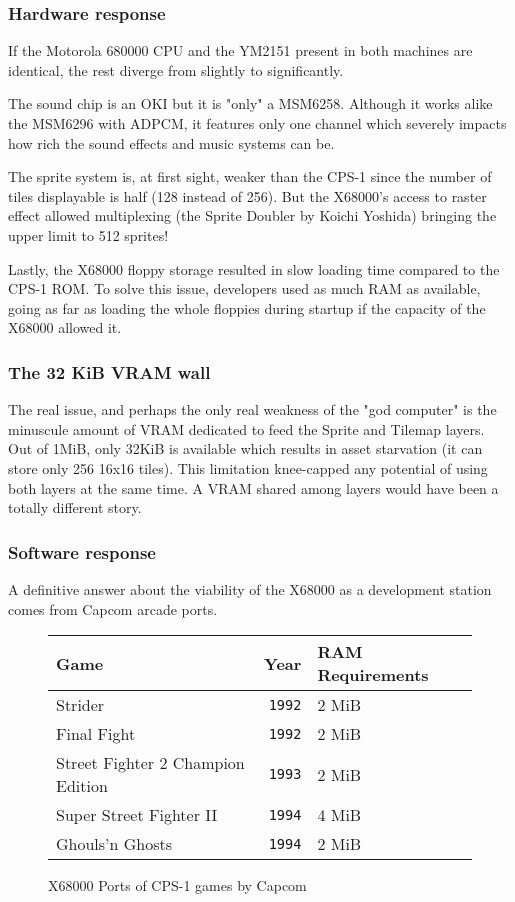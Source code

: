 \subsubsection{Hardware response}
If the Motorola 680000 CPU and the YM2151 present in both machines are identical, the rest diverge from slightly to significantly.

The sound chip is an OKI but it is "only" a MSM6258. Although it works alike the MSM6296 with ADPCM, it features only one channel which severely impacts how rich the sound effects and music systems can be.

The sprite system is, at first sight, weaker than the CPS-1 since the number of tiles displayable is half (128 instead of 256). But the X68000's  access to raster effect allowed multiplexing (the Sprite Doubler by Koichi Yoshida\cite{x68000spritedoubler}) bringing the upper limit to 512 sprites!

Lastly, the X68000 floppy storage resulted in slow loading time compared to the CPS-1 ROM. To solve this issue, developers used as much RAM as available, going as far as loading the whole floppies during startup if the capacity of the X68000 allowed it.



\subsubsection{The 32 KiB VRAM wall}

The real issue, and perhaps the only real weakness of the "god computer" is the minuscule amount of VRAM dedicated to feed the Sprite and Tilemap layers. Out of 1MiB, only 32KiB is available which results in asset starvation (it can store only  256 16x16 tiles). This limitation knee-capped any potential of using both layers at the same time. A VRAM shared among layers would have been a totally different story.

\subsubsection{Software response}

A definitive answer about the viability of the X68000 as a development station comes from Capcom arcade ports.
\begin{figure}[H]
\label{x68000-specs}
\begin{tabularx}{\textwidth}{lrY}
  \toprule    
  \textbf{Game } & \textbf{Year}  & \textbf{RAM Requirements } \\               
  \toprule   
  Strider & \texttt{1992} &  2 MiB \\
  Final Fight & \texttt{1992} &  2 MiB \\
  Street Fighter 2 Champion Edition & \texttt{1993} &  2 MiB \\
  Super Street Fighter II & \texttt{1994} &  4 MiB \\
  Ghouls'n Ghosts & \texttt{1994} &  2 MiB \\
    \toprule   
\end{tabularx}
\caption*{X68000 Ports of CPS-1 games by Capcom}
\end{figure}

